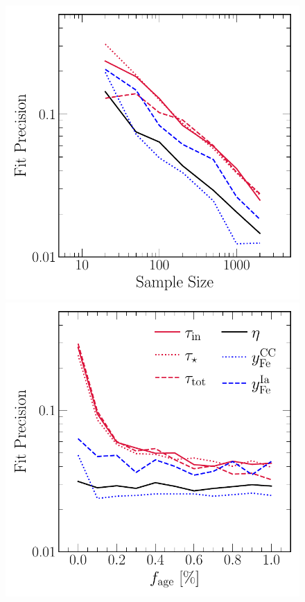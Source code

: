\documentclass[ms.tex]{subfiles}
\begin{document}
\begin{figure}
\centering
\includegraphics[scale = 0.6]{precision_samplesize.pdf}
\includegraphics[scale = 0.6]{precision_agefrac.pdf}

\end{figure}
\end{document}
